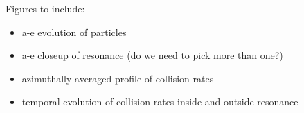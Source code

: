 \documentclass[twocolumn]{aastex62}
\begin{document}








Figures to include:

\begin{itemize}
    \item a-e evolution of particles
    \item a-e closeup of resonance (do we need to pick more than one?)
    \item azimuthally averaged profile of collision rates
    \item temporal evolution of collision rates inside and outside resonance
\end{itemize}
\end{document}
